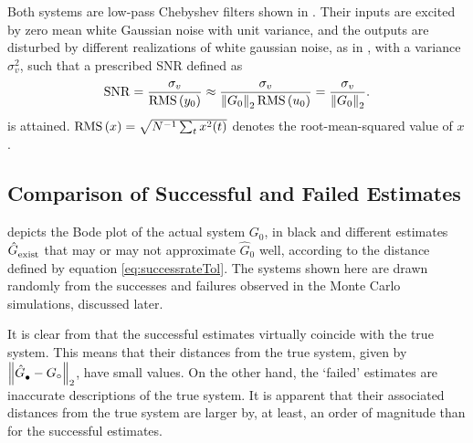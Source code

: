 Both systems are low-pass Chebyshev filters shown in . 
Their inputs are excited by zero mean white Gaussian noise with unit variance, and the outputs are disturbed by different realizations of white gaussian noise, as in , with a variance $\sigma_v^2$, such that a prescribed \gls{SNR} defined as
\begin{equation}
  \mathrm{SNR} 
    = \frac{\sigma_v}
           {\rms{y_0}}
    \approx \frac{\sigma_{v}}
                 {\left\| G_0 \right\|_2 \rms{u_0}}
    =  \frac{\sigma_{v}}
            {\left\| G_0 \right\|_2}
  \label{eq:SNR-definition}
  \text{.}
\end{equation}
is attained.
$\rms{x} = \sqrt{N^{-1} \sum_t x^2(t)}$ denotes the root-mean-squared value of $x$.


\subsection{Comparison of Successful and Failed Estimates}


  depicts the Bode plot of the actual system $G_0$, in black
 and different estimates $\model{exist}$
 that may or may not approximate $\hat{G}_{0}$ well, according to the distance defined by equation \eqref{eq:successrateTol}.
 The systems shown here are drawn randomly from the successes and failures observed in the Monte Carlo simulations, discussed later.
 
 It is clear from  that the successful estimates virtually coincide with the true system. This means 
that their distances from the true system, given by $\norm[2]{\model{\bullet} - \true{G}}$, have small values. 
On the other hand, the `failed' estimates are inaccurate descriptions of the true system. It is apparent that their associated distances from the true system are larger by, at least, an order of magnitude than for the successful estimates.
 
